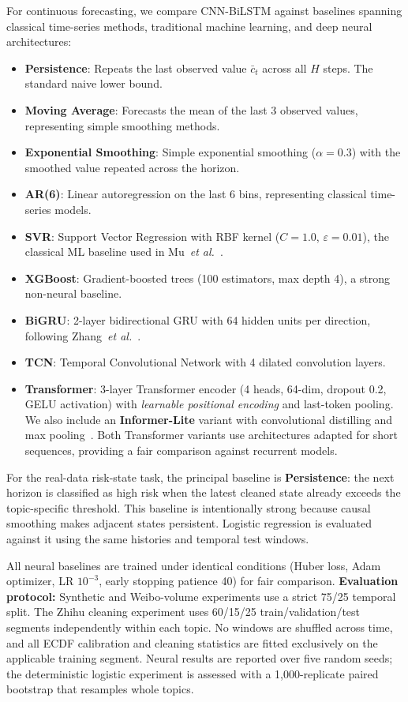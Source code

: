 \documentclass[journal]{IEEEtran}
\begin{document}
For continuous forecasting, we compare CNN-BiLSTM against baselines spanning classical time-series methods, traditional machine learning, and deep neural architectures:

\begin{itemize}
\item \textbf{Persistence}: Repeats the last observed value $\bar{c}_t$ across all $H$ steps. The standard naive lower bound.
\item \textbf{Moving Average}: Forecasts the mean of the last 3 observed values, representing simple smoothing methods.
\item \textbf{Exponential Smoothing}: Simple exponential smoothing ($\alpha{=}0.3$) with the smoothed value repeated across the horizon.
\item \textbf{AR(6)}: Linear autoregression on the last 6 bins, representing classical time-series models.
\item \textbf{SVR}: Support Vector Regression with RBF kernel ($C{=}1.0$, $\varepsilon{=}0.01$), the classical ML baseline used in Mu~\emph{et al.}~\cite{Mu2023IPSO}.
\item \textbf{XGBoost}: Gradient-boosted trees (100 estimators, max depth 4), a strong non-neural baseline.
\item \textbf{BiGRU}: 2-layer bidirectional GRU with 64 hidden units per direction, following Zhang~\emph{et al.}~\cite{Zhang2024TRESP}.
\item \textbf{TCN}: Temporal Convolutional Network with 4 dilated convolution layers.
\item \textbf{Transformer}: 3-layer Transformer encoder (4 heads, 64-dim, dropout 0.2, GELU activation) with \emph{learnable positional encoding} and last-token pooling. We also include an \textbf{Informer-Lite} variant with convolutional distilling and max pooling~\cite{zhou2021informer}. Both Transformer variants use architectures adapted for short sequences, providing a fair comparison against recurrent models.
\end{itemize}

For the real-data risk-state task, the principal baseline is \textbf{Persistence}: the next horizon is classified as high risk when the latest cleaned state already exceeds the topic-specific threshold. This baseline is intentionally strong because causal smoothing makes adjacent states persistent. Logistic regression is evaluated against it using the same histories and temporal test windows.

All neural baselines are trained under identical conditions (Huber loss, Adam optimizer, LR $10^{-3}$, early stopping patience 40) for fair comparison. \textbf{Evaluation protocol:} Synthetic and Weibo-volume experiments use a strict 75/25 temporal split. The Zhihu cleaning experiment uses 60/15/25 train/validation/test segments independently within each topic. No windows are shuffled across time, and all ECDF calibration and cleaning statistics are fitted exclusively on the applicable training segment. Neural results are reported over five random seeds; the deterministic logistic experiment is assessed with a 1,000-replicate paired bootstrap that resamples whole topics.
\end{document}
